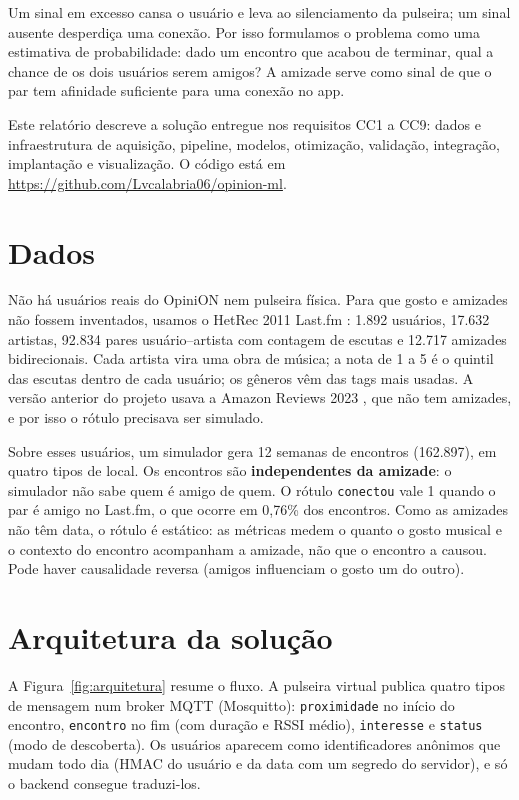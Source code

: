 \documentclass[12pt]{article}
\begin{document}
Um sinal em excesso cansa o usuário e leva ao silenciamento da pulseira; um sinal ausente desperdiça
uma conexão. Por isso formulamos o problema como uma estimativa de probabilidade: dado um encontro que
acabou de terminar, qual a chance de os dois usuários serem amigos? A amizade serve como sinal de que
o par tem afinidade suficiente para uma conexão no app.

Este relatório descreve a solução entregue nos requisitos CC1 a CC9: dados e infraestrutura de
aquisição, pipeline, modelos, otimização, validação, integração, implantação e visualização. O código
está em \url{https://github.com/Lvcalabria06/opinion-ml}.

\section{Dados}

Não há usuários reais do OpiniON nem pulseira física. Para que gosto e amizades não fossem inventados,
usamos o HetRec 2011 Last.fm \cite{cantador2011hetrec}: 1.892 usuários, 17.632 artistas, 92.834 pares
usuário--artista com contagem de escutas e 12.717 amizades bidirecionais. Cada artista vira uma obra
de música; a nota de 1 a 5 é o quintil das escutas dentro de cada usuário; os gêneros vêm das tags mais
usadas. A versão anterior do projeto usava a Amazon Reviews 2023 \cite{hou2024bridging}, que não tem
amizades, e por isso o rótulo precisava ser simulado.

Sobre esses usuários, um simulador gera 12 semanas de encontros (162.897), em quatro tipos de local. Os
encontros são \textbf{independentes da amizade}: o simulador não sabe quem é amigo de quem. O rótulo
\texttt{conectou} vale 1 quando o par é amigo no Last.fm, o que ocorre em 0,76\% dos encontros. Como as
amizades não têm data, o rótulo é estático: as métricas medem o quanto o gosto musical e o contexto do
encontro acompanham a amizade, não que o encontro a causou. Pode haver causalidade reversa (amigos
influenciam o gosto um do outro).

\section{Arquitetura da solução}

A Figura~\ref{fig:arquitetura} resume o fluxo. A pulseira virtual publica quatro tipos de mensagem num
broker MQTT (Mosquitto): \texttt{proximidade} no início do encontro, \texttt{encontro} no fim (com
duração e RSSI médio), \texttt{interesse} e \texttt{status} (modo de descoberta). Os usuários aparecem
como identificadores anônimos que mudam todo dia (HMAC do usuário e da data com um segredo do servidor),
e só o backend consegue traduzi-los.
\end{document}
